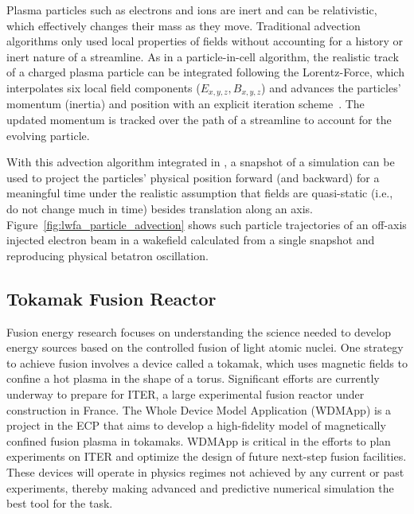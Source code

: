 Plasma particles such as electrons and ions are inert and can be relativistic, which effectively changes their mass as they move.
Traditional advection algorithms only used local properties of fields without accounting for a history or inert nature of a streamline.
As in a particle-in-cell algorithm, the realistic track of a charged plasma particle can be integrated following the Lorentz-Force, which interpolates six local field components ($E_{x,y,z}, B_{x,y,z}$) and advances the particles' momentum (inertia) and position with an explicit iteration scheme~\citep{Boris1970}.
The updated momentum is tracked over the path of a streamline to account for the evolving particle.

With this advection algorithm integrated in \vtkm, a snapshot of a simulation can be used to project the particles' physical position forward (and backward) for a meaningful time under the realistic assumption that fields are quasi-static (i.e., do not change much in time) besides translation along an axis.
Figure~\ref{fig:lwfa_particle_advection} shows such particle trajectories of an off-axis injected electron beam in a wakefield calculated from a single snapshot and reproducing physical betatron oscillation.


\subsection{Tokamak Fusion Reactor}


Fusion energy research focuses on understanding the science needed to develop energy sources based on the controlled fusion of light atomic nuclei. One strategy to achieve fusion involves a device called a tokamak, which uses magnetic fields to confine a hot plasma in the shape of a torus.
Significant efforts are currently underway to prepare for ITER, a large experimental fusion reactor under construction in France.
The Whole Device Model Application (WDMApp) is a project in the ECP that aims to develop a high-fidelity model of magnetically confined fusion plasma in tokamaks. 
WDMApp is critical in the efforts to plan experiments on ITER and optimize the design of future next-step fusion facilities. These devices will operate in physics regimes not achieved by any current or past experiments, thereby making advanced and predictive numerical simulation the best tool for the task.




